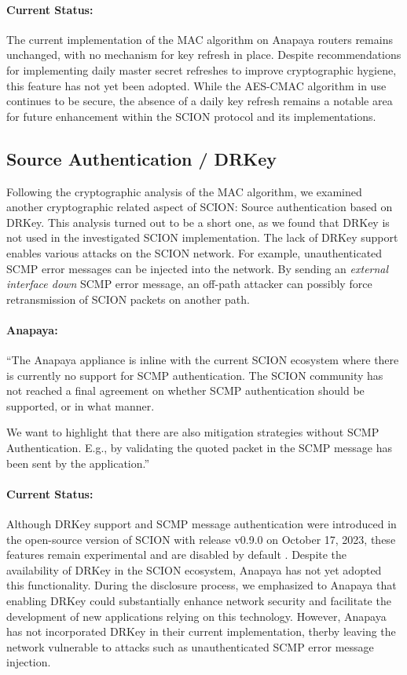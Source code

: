 \paragraph{Current Status:}
The current implementation of the MAC algorithm on Anapaya routers remains unchanged, with no mechanism for key refresh in place.
Despite recommendations for implementing daily master secret refreshes to improve cryptographic hygiene, this feature has not yet been adopted.
While the AES-CMAC algorithm in use continues to be secure, the absence of a daily key refresh remains a notable area for future enhancement within the SCION protocol and its implementations.

\subsection{Source Authentication / DRKey}
\label{sec:source-authentication}
Following the cryptographic analysis of the MAC algorithm, we examined another cryptographic related aspect of SCION: Source authentication based on DRKey.
This analysis turned out to be a short one, as we found that DRKey is not used in the investigated SCION implementation.
The lack of DRKey support enables various attacks on the SCION network.
For example, unauthenticated SCMP error messages can be injected into the network.
By sending an \textit{external interface down} SCMP error message, an off-path attacker can possibly force retransmission of SCION packets on another path.

\begin{boxH}
\paragraph{Anapaya:}
``The Anapaya appliance is inline with the current SCION ecosystem where there is currently no support for SCMP authentication. The SCION community has not reached a final agreement on whether SCMP authentication should be supported, or in what manner.

We want to highlight that there are also mitigation strategies without SCMP Authentication. E.g., by validating the quoted packet in the SCMP message has been sent by the application.''
\end{boxH}


\paragraph{Current Status:}
Although DRKey support and SCMP message authentication were introduced in the open-source version of SCION with release v0.9.0 on October 17, 2023, these features remain experimental and are disabled by default \cite{SCIONReleaseV090}.
Despite the availability of DRKey in the SCION ecosystem, Anapaya has not yet adopted this functionality.
During the disclosure process, we emphasized to Anapaya that enabling DRKey could substantially enhance network security and facilitate the development of new applications relying on this technology.
However, Anapaya has not incorporated DRKey in their current implementation, therby leaving the network vulnerable to attacks such as unauthenticated SCMP error message injection.


